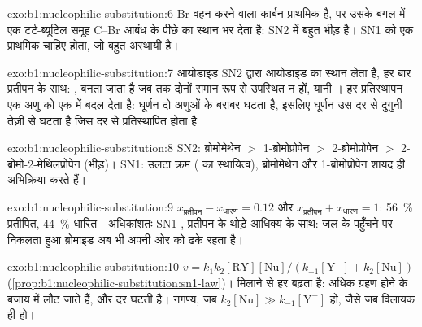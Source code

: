 \begin{solution}{exo:b1:nucleophilic-substitution:6}
Br वहन करने वाला कार्बन प्राथमिक है, पर उसके बगल में एक टर्ट-ब्यूटिल समूह
C--Br आबंध के पीछे का स्थान भर देता है: SN2  में बहुत
भीड़ है। SN1 को एक प्राथमिक  चाहिए होता, जो बहुत अस्थायी है।
\end{solution}

\begin{solution}{exo:b1:nucleophilic-substitution:7}
आयोडाइड SN2 द्वारा आयोडाइड का स्थान लेता है, हर बार प्रतीपन के साथ: ,
 बनता जाता है जब तक दोनों समान रूप से उपस्थित न हों, यानी । हर
प्रतिस्थापन एक  अणु को एक  में बदल देता है: घूर्णन
दो अणुओं के बराबर घटता है, इसलिए घूर्णन उस दर से दुगुनी तेज़ी से घटता है जिस दर से
 प्रतिस्थापित होता है।
\end{solution}

\begin{solution}{exo:b1:nucleophilic-substitution:8}
SN2: ब्रोमोमेथेन $>$ 1-ब्रोमोप्रोपेन $>$ 2-ब्रोमोप्रोपेन $>$
2-ब्रोमो-2-मेथिलप्रोपेन (भीड़)। SN1: उलटा क्रम ( का
स्थायित्व), ब्रोमोमेथेन और 1-ब्रोमोप्रोपेन शायद ही अभिक्रिया करते हैं।
\end{solution}

\begin{solution}{exo:b1:nucleophilic-substitution:9}
$x_{\text{प्रतीपन}} - x_{\text{धारण}} = 0.12$ और $x_{\text{प्रतीपन}} + x_{\text{धारण}} = 1$:
\qty{56}{\percent} प्रतीपित, \qty{44}{\percent} धारित। अधिकांशतः SN1
, प्रतीपन के थोड़े आधिक्य के साथ: जल के पहुँचने पर निकलता हुआ ब्रोमाइड
अब भी अपनी ओर को ढके रहता है।
\end{solution}

\begin{solution}{exo:b1:nucleophilic-substitution:10}
$v = k_1k_2[\mathrm{RY}][\mathrm{Nu}]/(k_{-1}[\mathrm{Y^-}] + k_2[\mathrm{Nu}])$
(\cref{prop:b1:nucleophilic-substitution:sn1-law})।  मिलाने से
हर बढ़ता है: अधिक  ग्रहण होने के बजाय  में
लौट जाते हैं, और दर घटती है। नगण्य, जब
$k_2[\mathrm{Nu}] \gg k_{-1}[\mathrm{Y^-}]$ हो, जैसे जब 
विलायक ही हो।
\end{solution}

